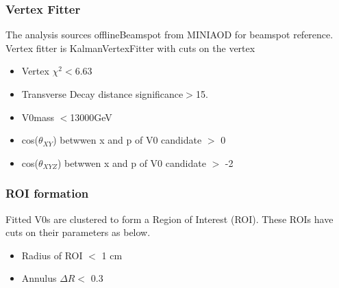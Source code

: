 \subsubsection{Vertex Fitter}\label{sec:ROI_V0Fitter}

The analysis sources offlineBeamspot from MINIAOD for beamspot reference.
Vertex fitter is KalmanVertexFitter with cuts on the vertex
\begin{itemize}
  \item Vertex $\chi^{2}<$6.63 
  \item Transverse Decay distance significance$>$15.
  \item V0mass $<$13000GeV
  \item cos($\theta_{XY}$) betwwen x and p of V0 candidate $>$ 0
  \item cos($\theta_{XYZ}$) betwwen x and p of V0 candidate $>$ -2
\end{itemize}


\subsubsection{ROI formation}\label{sec:ROI_ROIformation}

Fitted V0s are clustered to form a Region of Interest (ROI).
These ROIs have cuts on their parameters as below.
\begin{itemize}
  \item Radius of ROI $<$ 1 cm
  \item Annulus $\Delta R <$ 0.3 
\end{itemize}


